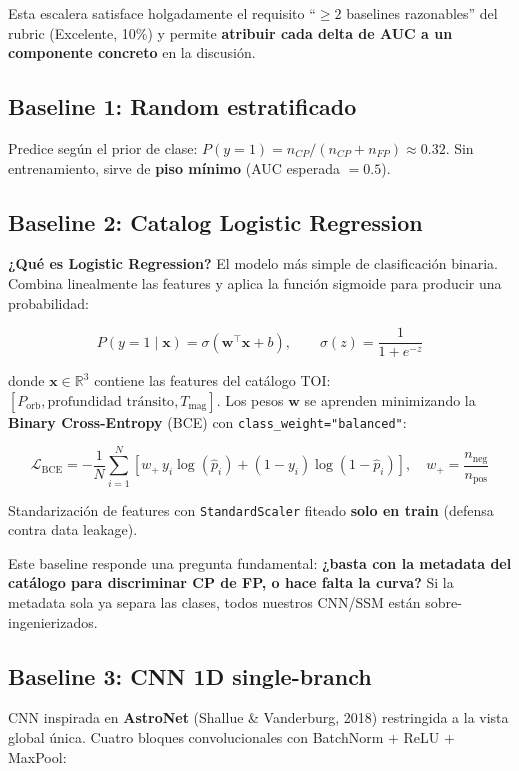 \documentclass[11pt, a4paper]{article}
\begin{document}
Esta escalera satisface holgadamente el requisito ``$\geq 2$ baselines razonables'' del rubric (Excelente, 10\%) y permite \textbf{atribuir cada delta de AUC a un componente concreto} en la discusión.

\subsection{Baseline 1: Random estratificado}

Predice según el prior de clase: $P(y=1) = n_{CP}/(n_{CP}+n_{FP}) \approx 0.32$. Sin entrenamiento, sirve de \textbf{piso mínimo} (AUC esperada $= 0.5$).

\subsection{Baseline 2: Catalog Logistic Regression}

\textbf{¿Qué es Logistic Regression?} El modelo más simple de clasificación binaria. Combina linealmente las features y aplica la función sigmoide para producir una probabilidad:

$$
P(y=1 \mid \mathbf{x}) = \sigma(\mathbf{w}^\top \mathbf{x} + b), \qquad \sigma(z) = \frac{1}{1 + e^{-z}}
$$

donde $\mathbf{x} \in \mathbb{R}^3$ contiene las features del catálogo TOI: $[P_{\text{orb}}, \text{profundidad tránsito}, T_{\text{mag}}]$. Los pesos $\mathbf{w}$ se aprenden minimizando la \textbf{Binary Cross-Entropy} (BCE) con \texttt{class\_weight="balanced"}:

$$
\mathcal{L}_{\text{BCE}} = -\frac{1}{N}\sum_{i=1}^N \left[ w_+ \, y_i \log(\hat{p}_i) + (1 - y_i) \log(1 - \hat{p}_i) \right], \quad w_+ = \frac{n_{\text{neg}}}{n_{\text{pos}}}
$$

Standarización de features con \texttt{StandardScaler} fiteado \textbf{solo en train} (defensa contra data leakage).

Este baseline responde una pregunta fundamental: \textbf{¿basta con la metadata del catálogo para discriminar CP de FP, o hace falta la curva?} Si la metadata sola ya separa las clases, todos nuestros CNN/SSM están sobre-ingenierizados.

\subsection{Baseline 3: CNN 1D single-branch}

CNN inspirada en \textbf{AstroNet} (Shallue \& Vanderburg, 2018) restringida a la vista global única. Cuatro bloques convolucionales con BatchNorm + ReLU + MaxPool:
\end{document}
